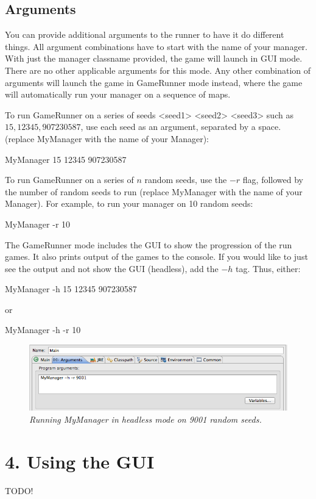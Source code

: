 \documentclass[11pt]{article}
\begin{document}
\subsection{Arguments}
You can provide additional arguments to the runner to have it do different things. All argument combinations have to start with the name of your manager. With just the manager classname provided, the game will launch in GUI mode. There are no other applicable arguments for this mode. Any other combination of arguments will launch the game in GameRunner mode instead, where the game will automatically run your manager on a sequence of maps. 

To run GameRunner on a series of seeds <seed1> <seed2> <seed3> such as $15, 12345, 907230587$, use each seed as an argument, separated by a space. (replace MyManager with the name of your Manager):
\begin{center}
MyManager 15 12345 907230587
\end{center}
To run GameRunner on a series of $n$ random seeds, use the $-r$ flag, followed by the number of random seeds to run (replace MyManager with the name of your Manager). For example, to run your manager on 10 random seeds:
\begin{center}
MyManager -r 10
\end{center}
The GameRunner mode includes the GUI to show the progression of the run games. It also prints output of the games to the console. If you would like to just see the output and not show the GUI (headless), add the $-h$ tag. Thus, either:
\begin{center}
MyManager -h 15 12345 907230587
\end{center}
or
\begin{center}
MyManager -h -r 10
\end{center}
\begin{figure}[h]
\centerline{\includegraphics[scale=0.65]{args.png}} 
\caption{\em{Running MyManager in headless mode on 9001 random seeds.}}
\end{figure}


\newpage
\section{4. Using the GUI}
TODO!
\end{document}
